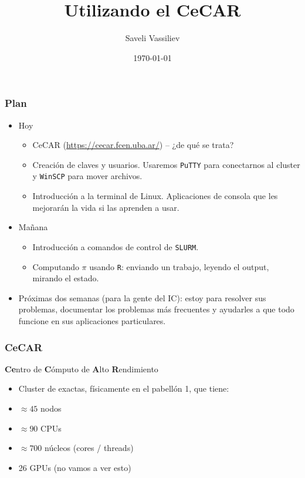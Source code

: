 \documentclass[]{beamer}
\title[CeCAR]{Utilizando el CeCAR}
\author[Saveli Vassiliev]{Saveli Vassiliev}
\institute[UBA, FCEyN, IC]{Universidad de Buenos Aires \\ Facultad de Ciencias Exactas y Naturales, Instituto de Cálculo}
\date{\today}                    %
\begin{document}
\begin{frame}
  \titlepage
\end{frame}

%


\begin{frame}
\frametitle{Plan}
\begin{itemize}
  \item<+-> Hoy
  \begin{itemize}
    \item CeCAR (\url{https://cecar.fcen.uba.ar/}) -- ¿de qué se trata?
    \item Creación de claves y usuarios. Usaremos \Verb=PuTTY= para conectarnos al cluster y \Verb=WinSCP= para mover archivos.
    \item Introducción a la terminal de Linux. Aplicaciones de consola que les mejorarán la vida si las aprenden a usar.
  \end{itemize}
  \item<+-> Mañana
  \begin{itemize}
    \item Introducción a comandos de control de \Verb=SLURM=.
    \item Computando $\pi$ usando \Verb=R=: enviando un trabajo, leyendo el output, mirando el estado.
  \end{itemize}
  \item<+-> Próximas dos semanas (para la gente del IC): estoy para resolver sus problemas, documentar los problemas más frecuentes y ayudarles a que todo funcione en sus aplicaciones particulares.
\end{itemize}
\end{frame}

\begin{frame}
\frametitle{CeCAR}
\textbf{Ce}ntro de \textbf{C}ómputo de \textbf{A}lto \textbf{R}endimiento

\begin{itemize}
  \item<+-> Cluster de exactas, físicamente en el pabellón 1, que tiene:
  \item<+-> $\approx 45$ nodos
  \item<+-> $\approx 90$ CPUs
  \item<+-> $\approx 700$ núcleos (cores / threads)
  \item<+-> 26 GPUs (no vamos a ver esto)
\end{itemize}
\end{frame}
\end{document}
